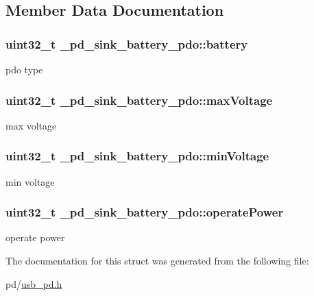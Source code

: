 \subsection{Member Data Documentation}
\hypertarget{struct__pd__sink__battery__pdo_a417d58609316fbebd02091b96ec83ed8}{
\subsubsection[{battery}]{\setlength{\rightskip}{0pt plus 5cm}uint32\-\_\-t \-\_\-pd\-\_\-sink\-\_\-battery\-\_\-pdo\-::battery}}\label{struct__pd__sink__battery__pdo_a417d58609316fbebd02091b96ec83ed8}
pdo type \hypertarget{struct__pd__sink__battery__pdo_a5fe153e249c105e6b8414233ae216710}{
\subsubsection[{max\-Voltage}]{\setlength{\rightskip}{0pt plus 5cm}uint32\-\_\-t \-\_\-pd\-\_\-sink\-\_\-battery\-\_\-pdo\-::max\-Voltage}}\label{struct__pd__sink__battery__pdo_a5fe153e249c105e6b8414233ae216710}
max voltage \hypertarget{struct__pd__sink__battery__pdo_a473824d26b81e000486844b83e32b09d}{
\subsubsection[{min\-Voltage}]{\setlength{\rightskip}{0pt plus 5cm}uint32\-\_\-t \-\_\-pd\-\_\-sink\-\_\-battery\-\_\-pdo\-::min\-Voltage}}\label{struct__pd__sink__battery__pdo_a473824d26b81e000486844b83e32b09d}
min voltage \hypertarget{struct__pd__sink__battery__pdo_aede06aa3716908a68c90828fbfe5cebe}{
\subsubsection[{operate\-Power}]{\setlength{\rightskip}{0pt plus 5cm}uint32\-\_\-t \-\_\-pd\-\_\-sink\-\_\-battery\-\_\-pdo\-::operate\-Power}}\label{struct__pd__sink__battery__pdo_aede06aa3716908a68c90828fbfe5cebe}
operate power 

The documentation for this struct was generated from the following file\-:\begin{DoxyCompactItemize}
\item 
pd/\hyperlink{usb__pd_8h}{usb\-\_\-pd.\-h}\end{DoxyCompactItemize}
